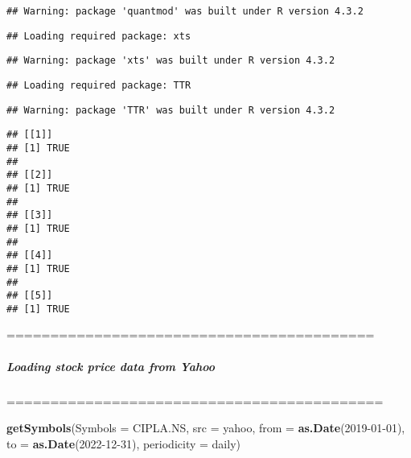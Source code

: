 \documentclass[
]{article}
\newenvironment{Shaded}{\begin{snugshade}}{\end{snugshade}}
\newcommand{\AttributeTok}[1]{\textcolor[rgb]{0.13,0.29,0.53}{#1}}
\newcommand{\FunctionTok}[1]{\textcolor[rgb]{0.13,0.29,0.53}{\textbf{#1}}}
\newcommand{\NormalTok}[1]{#1}
\newcommand{\StringTok}[1]{\textcolor[rgb]{0.31,0.60,0.02}{#1}}
\begin{document}
\begin{verbatim}
## Warning: package 'quantmod' was built under R version 4.3.2
\end{verbatim}

\begin{verbatim}
## Loading required package: xts
\end{verbatim}

\begin{verbatim}
## Warning: package 'xts' was built under R version 4.3.2
\end{verbatim}

\begin{verbatim}
## Loading required package: TTR
\end{verbatim}

\begin{verbatim}
## Warning: package 'TTR' was built under R version 4.3.2
\end{verbatim}

\begin{verbatim}
## [[1]]
## [1] TRUE
## 
## [[2]]
## [1] TRUE
## 
## [[3]]
## [1] TRUE
## 
## [[4]]
## [1] TRUE
## 
## [[5]]
## [1] TRUE
\end{verbatim}

==========================================

\hypertarget{loading-stock-price-data-from-yahoo}{%
\subparagraph{\texorpdfstring{\textbf{Loading stock price data from
Yahoo}}{Loading stock price data from Yahoo}}\label{loading-stock-price-data-from-yahoo}}

===========================================

\begin{Shaded}
\begin{Highlighting}[]
\FunctionTok{getSymbols}\NormalTok{(}\AttributeTok{Symbols =} \StringTok{\textquotesingle{}CIPLA.NS\textquotesingle{}}\NormalTok{, }
           \AttributeTok{src =} \StringTok{\textquotesingle{}yahoo\textquotesingle{}}\NormalTok{, }
           \AttributeTok{from =} \FunctionTok{as.Date}\NormalTok{(}\StringTok{\textquotesingle{}2019{-}01{-}01\textquotesingle{}}\NormalTok{), }
           \AttributeTok{to =} \FunctionTok{as.Date}\NormalTok{(}\StringTok{\textquotesingle{}2022{-}12{-}31\textquotesingle{}}\NormalTok{),}
           \AttributeTok{periodicity =} \StringTok{\textquotesingle{}daily\textquotesingle{}}\NormalTok{)}
\end{Highlighting}
\end{Shaded}
\end{document}
